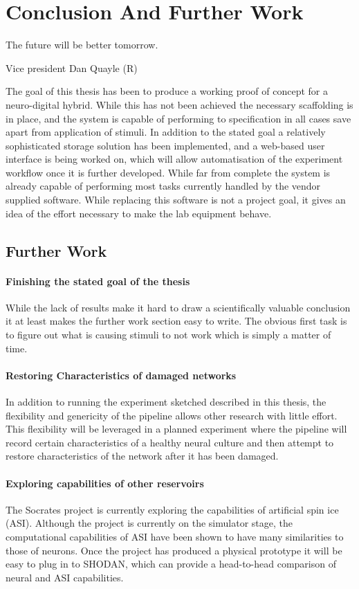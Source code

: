 \chapter{Conclusion And Further Work}
\epigraph{The future will be better tomorrow.}
{Vice president Dan Quayle (R)}
The goal of this thesis has been to produce a working proof of concept for
a neuro-digital hybrid.
While this has not been achieved the necessary scaffolding is in place, and the
system is capable of performing to specification in all cases save apart from
application of stimuli.
In addition to the stated goal a relatively sophisticated storage solution has
been implemented, and a web-based user interface is being worked on, which will
allow automatisation of the experiment workflow once it is further developed.
While far from complete the system is already capable of performing most tasks
currently handled by the vendor supplied software.
While replacing this software is not a project goal, it gives an idea of the
effort necessary to make the lab equipment behave.
\section{Further Work}
\subsubsection{Finishing the stated goal of the thesis}
While the lack of results make it hard to draw a scientifically valuable
conclusion it at least makes the further work section easy to write.
The obvious first task is to figure out what is causing stimuli to not work
which is simply a matter of time.
\subsubsection{Restoring Characteristics of damaged networks}
In addition to running the experiment sketched described in this thesis, the
flexibility and genericity of the pipeline allows other research with little
effort.
This flexibility will be leveraged in a planned experiment where the pipeline
will record certain characteristics of a healthy neural culture and then attempt
to restore characteristics of the network after it has been damaged.
\subsubsection{Exploring capabilities of other reservoirs}
The Socrates project is currently exploring the capabilities of artificial spin
ice (ASI).
Although the project is currently on the simulator stage, the computational
capabilities of ASI have been shown to have many similarities to those of
neurons.
Once the project has produced a physical prototype it will be easy to plug in to
SHODAN, which can provide a head-to-head comparison of neural and ASI
capabilities.
